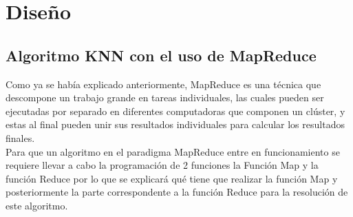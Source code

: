 \section{Diseño} \label{disalg}
\subsection{Algoritmo KNN con el uso de MapReduce}
\label{seccionalgoritmomapreduce}
Como ya se había explicado anteriormente, MapReduce es una técnica que descompone un trabajo grande en tareas individuales, las cuales pueden ser ejecutadas por separado en diferentes computadoras que componen un clúster, y estas al final pueden unir sus resultados individuales para calcular los resultados finales.\\
Para que un algoritmo en el paradigma MapReduce entre en funcionamiento se requiere llevar a cabo la programación de 2 funciones la Función Map y la función Reduce por lo que se explicará qué tiene que realizar la función Map y posteriormente la parte correspondente a la función Reduce para la resolución de este algoritmo.\\

